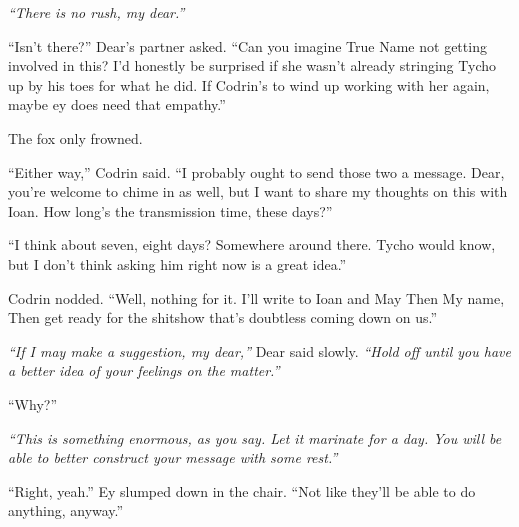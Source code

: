 \emph{``There is no rush, my dear.''}

``Isn't there?'' Dear's partner asked. ``Can you imagine True Name not getting involved in this? I'd honestly be surprised if she wasn't already stringing Tycho up by his toes for what he did. If Codrin's to wind up working with her again, maybe ey does need that empathy.''

The fox only frowned.

``Either way,'' Codrin said. ``I probably ought to send those two a message. Dear, you're welcome to chime in as well, but I want to share my thoughts on this with Ioan. How long's the transmission time, these days?''

``I think about seven, eight days? Somewhere around there. Tycho would know, but I don't think asking him right now is a great idea.''

Codrin nodded. ``Well, nothing for it. I'll write to Ioan and May Then My name, Then get ready for the shitshow that's doubtless coming down on us.''

\emph{``If I may make a suggestion, my dear,''} Dear said slowly. \emph{``Hold off until you have a better idea of your feelings on the matter.''}

``Why?''

\emph{``This is something enormous, as you say. Let it marinate for a day. You will be able to better construct your message with some rest.''}

``Right, yeah.'' Ey slumped down in the chair. ``Not like they'll be able to do anything, anyway.''
